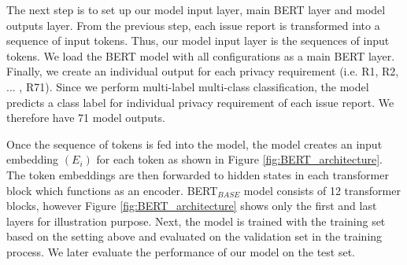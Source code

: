 The next step is to set up our model input layer, main BERT layer and model outputs layer. From the previous step, each issue report is transformed into a sequence of input tokens. Thus, our model input layer is the sequences of input tokens. We load the BERT model with all configurations as a main BERT layer. Finally, we create an individual output for each privacy requirement (i.e. R1, R2, ... , R71). Since we perform multi-label multi-class classification, the model predicts a class label for individual privacy requirement of each issue report. We therefore have 71 model outputs.

Once the sequence of tokens is fed into the model, the model creates an input embedding $(E_{i})$ for each token as shown in Figure \ref{fig:BERT_architecture}. The token embeddings are then forwarded to hidden states in each transformer block which functions as an encoder. BERT$_{BASE}$ model consists of 12 transformer blocks, however Figure \ref{fig:BERT_architecture} shows only the first and last layers for illustration purpose. Next, the model is trained with the training set based on the setting above and evaluated on the validation set in the training process. We later evaluate the performance of our model on the test set. 